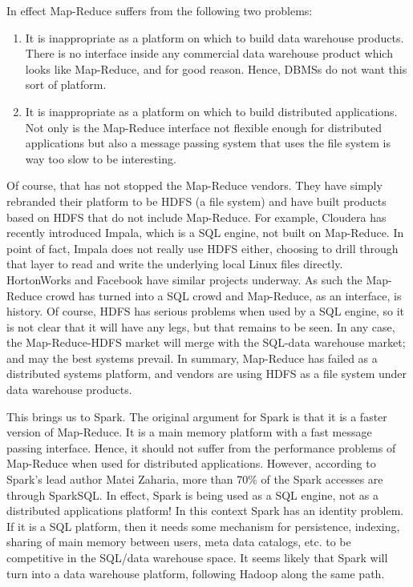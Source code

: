 \documentclass[b5paper,11pt,twoside,openright]{book}
\begin{document}
\enlargethispage{-3\baselineskip}
In effect Map-Reduce suffers from the following two problems:

\begin{enumerate}
  \item
  It is inappropriate as a platform on which to build data warehouse
  products. There is no interface inside any commercial data warehouse
  product which looks like Map-Reduce, and for good reason. Hence, DBMSs
  do not want this sort of platform.
  \item
  It is inappropriate as a platform on which to build distributed
  applications. Not only is the Map-Reduce interface not flexible enough
  for distributed applications but also a message passing system that
  uses the file system is way too slow to be interesting.
\end{enumerate}

Of course, that has not stopped the Map-Reduce vendors. They have simply
rebranded their platform to be HDFS (a file system) and have built
products based on HDFS that do not include Map-Reduce. For example,
Cloudera has recently introduced Impala, which is a SQL engine, not
built on Map-Reduce. In point of fact, Impala does not really use HDFS
either, choosing to drill through that layer to read and write the
underlying local Linux files directly. HortonWorks and Facebook have
similar projects underway. As such the Map-Reduce crowd has turned into
a SQL crowd and Map-Reduce, as an interface, is history. Of course, HDFS
has serious problems when used by a SQL engine, so it is not clear that
it will have any legs, but that remains to be seen. In any case, the
Map-Reduce-HDFS market will merge with the SQL-data warehouse market;
and may the best systems prevail. In summary, Map-Reduce has failed as a
distributed systems platform, and vendors are using HDFS as a file
system under data warehouse products.

This brings us to Spark. The original argument for Spark is that it is a
faster version of Map-Reduce. It is a main memory platform with a fast
message passing interface. Hence, it should not suffer from the
performance problems of Map-Reduce when used for distributed
applications. However, according to Spark's lead author Matei Zaharia,
more than 70\% of the Spark accesses are through SparkSQL. In effect,
Spark is being used as a SQL engine, not as a distributed applications
platform! In this context Spark has an identity problem. If it is a SQL
platform, then it needs some mechanism for persistence, indexing,
sharing of main memory between users, meta data catalogs, etc. to be
competitive in the SQL/data warehouse space. It seems likely that Spark
will turn into a data warehouse platform, following Hadoop along the
same path.
\end{document}
